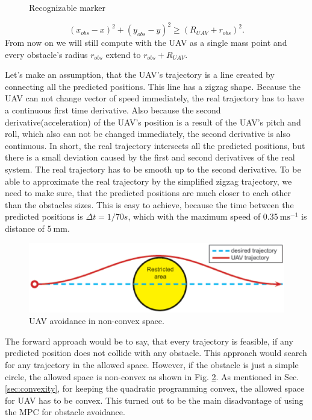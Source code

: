 \documentclass[a4paper,11pt,titlepage]{article}
\newcommand{\jed}[1]{\ensuremath{~\mathrm{#1}}}
\begin{document}
\begin{figure}[h]
\begin{minipage}{0.48\textwidth}
  \caption{Recognizable marker}
  \label{fig:blob}
\end{minipage}
\end{figure}



\begin{equation}
(x_{obs} - x)^2 + (y_{obs} - y)^2 \geq (R_{UAV} + r_{obs})^2.
\end{equation}
From now on we will still compute with the UAV as a single mass point and every obstacle's radius $r_{obs}$ extend to $r_{obs} + R_{UAV}$.

Let's make an assumption, that the UAV's trajectory is a line created by connecting all the predicted positions. This line has a zigzag shape. Because the UAV can not change vector of speed immediately, the real trajectory has to have a continuous first time derivative. Also because the second derivative(acceleration) of the UAV's position is a result of the UAV's pitch and roll, which also can not be changed immediately, the second derivative is also continuous. In short, the real trajectory intersects all the predicted positions, but there is a small deviation caused by the first and second derivatives of the real system. The real trajectory has to be smooth up to the second derivative. To be able to approximate the real trajectory by the simplified zigzag trajectory, we need to make sure, that the predicted positions are much closer to each other than the obstacles sizes. This is easy to achieve, because the time between the predicted positions is $\Delta t = 1/70s$, which with the maximum speed of 0.35\jed{ms^{-1}} is distance of 5\jed{mm}.

\begin{figure}[h]
\centering
\includegraphics[width=1\textwidth]{fig/perfect_collision_avoidance_arrow.eps} 
\caption{UAV avoidance in non-convex space.}
\label{fig:perfect_collision_avoidance}
\end{figure}

The forward approach would be to say, that every trajectory is feasible, if any predicted position does not collide with any obstacle. This approach would search for any trajectory in the allowed space. However, if the obstacle is just a simple circle, the allowed space is non-convex as shown in Fig. \ref{fig:perfect_collision_avoidance}. As mentioned in Sec.  \ref{sec:convexity}, for keeping the quadratic programming convex, the allowed space for UAV has to be convex. This turned out to be the main disadvantage of using the MPC for obstacle avoidance. 
\end{document}
